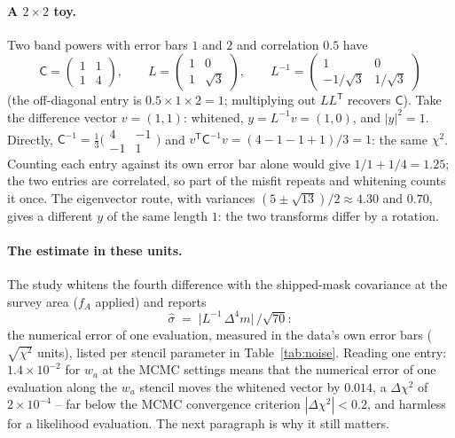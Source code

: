 \documentclass[11pt]{article}
\newcommand{\Cov}{\mathsf{C}}
\newcommand{\T}{^{\mathsf{T}}}
\begin{document}
\paragraph{A $2 \times 2$ toy.}
Two band powers with error bars $1$ and $2$ and correlation $0.5$
have
\begin{equation}
  \Cov = \begin{pmatrix} 1 & 1 \\ 1 & 4 \end{pmatrix},
  \qquad
  L = \begin{pmatrix} 1 & 0 \\ 1 & \sqrt{3} \end{pmatrix},
  \qquad
  L^{-1} = \begin{pmatrix} 1 & 0 \\ -1/\sqrt{3} & 1/\sqrt{3}
  \end{pmatrix}
  \label{eq:whitentoy}
\end{equation}
(the off-diagonal entry is $0.5 \times 1 \times 2 = 1$; multiplying
out $LL\T$ recovers $\Cov$).  Take the difference vector $v = (1, 1)$:
whitened, $y = L^{-1}v = (1, 0)$, and $|y|^2 = 1$.  Directly,
$\Cov^{-1} = \tfrac{1}{3}\bigl(\begin{smallmatrix} 4 & -1 \\
-1 & 1 \end{smallmatrix}\bigr)$ and
$v\T\Cov^{-1}v = (4 - 1 - 1 + 1)/3 = 1$: the same $\chi^2$.  Counting
each entry against its own error bar alone would give
$1/1 + 1/4 = 1.25$; the two entries are correlated, so part of the
misfit repeats and whitening counts it once.  The eigenvector route,
with variances $(5 \pm \sqrt{13})/2 \approx 4.30$ and $0.70$, gives a
different $y$ of the same length $1$: the two transforms differ by a
rotation.

\paragraph{The estimate in these units.}
The study whitens the fourth difference with the shipped-mask
covariance at the survey area ($f_A$ applied) and reports
\begin{equation}
  \hat{\sigma} \;=\; \bigl|L^{-1}\,\Delta^4 m\bigr|\,/\sqrt{70} :
  \label{eq:noisehat}
\end{equation}
the numerical error of one evaluation, measured in the data's own
error bars ($\sqrt{\chi^2}$ units), listed per stencil parameter in
Table~\ref{tab:noise}.  Reading one entry: $1.4\times10^{-2}$ for
$w_a$ at the MCMC settings means that the numerical error of one
evaluation along the $w_a$ stencil moves the whitened vector by
$0.014$, a $\Delta\chi^2$ of $2\times10^{-4}$ -- far below the MCMC
convergence criterion $|\Delta\chi^2| < 0.2$, and harmless for a
likelihood evaluation.  The next paragraph is why it still matters.
\end{document}
